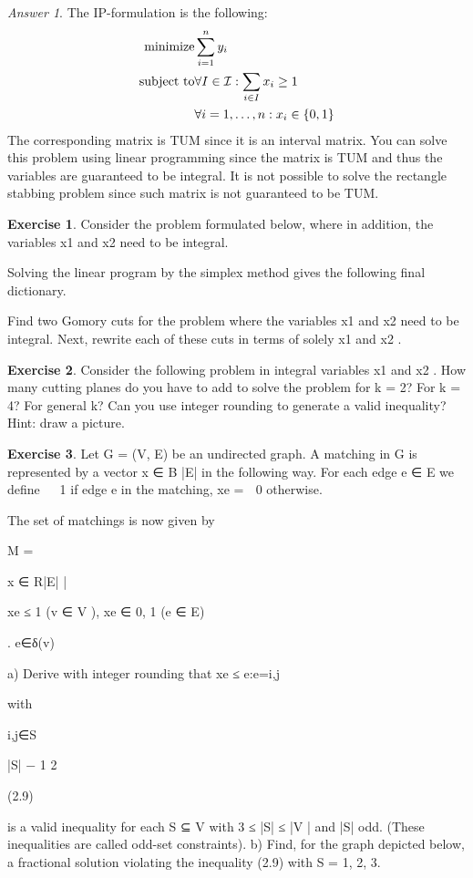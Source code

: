 \documentclass[titlepage]{book}
\theoremstyle{plain}
\theoremstyle{definition}
\newtheorem{exercise}{Exercise}[chapter]
\theoremstyle{remark}
\newtheorem{answer}{Answer}
\begin{document}
\begin{answer}
The IP-formulation is the following:
\begin{eqnarray}
\mbox{minimize}&\sumieqb[i]{1}{n}{y_i}\eqnlab{rsv-m}\\
\mbox{subject to}&\forall I\in\calI:\sumdomain[i]{I}{x_{i}}\geq 1\eqnlab{rsv-c1}\\
&\forall\rangei[i]{1}{n}:x_i\in\accl{0,1}\eqnlab{rsv-c2}
\end{eqnarray}
The corresponding matrix is TUM since it is an interval matrix. You can solve this problem using linear programming since the matrix is TUM and thus the variables are guaranteed to be integral. It is not possible to solve the rectangle stabbing problem since such matrix is not guaranteed to be TUM.
\end{answer}
\begin{exercise}
Consider the problem formulated below, where in addition, the variables x1 and x2 need to be integral.


Solving the linear program by the simplex method gives the following final dictionary.


Find two Gomory cuts for the problem where the variables x1 and x2 need to be integral. Next, rewrite
each of these cuts in terms of solely x1 and x2 .
\end{exercise}
\begin{exercise}
Consider the following problem in integral variables x1 and x2 . How many cutting planes do you have to
add to solve the problem for k = 2? For k = 4? For general k? Can you use integer rounding to generate
a valid inequality? Hint: draw a picture.

\end{exercise}
\begin{exercise}
Let G = (V, E) be an undirected graph. A matching in G is represented by a vector x ∈ B |E| in the
following way. For each edge e ∈ E we define

 1 if edge e in the matching,
xe =
 0 otherwise.

The set of matchings is now given by

M = {x ∈ R|E| |

xe ≤ 1 (v ∈ V ), xe ∈ {0, 1} (e ∈ E)}.
e∈δ(v)

a) Derive with integer rounding that
xe ≤
e:e={i,j}

with

i,j∈S

|S| − 1
2

(2.9)

is a valid inequality for each S ⊆ V with 3 ≤ |S| ≤ |V | and |S| odd. (These inequalities are called
odd-set constraints).
b) Find, for the graph depicted below, a fractional solution violating the inequality (2.9) with S =
{1, 2, 3}.
\end{exercise}
\end{document}
